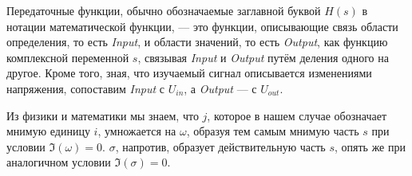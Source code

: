 \documentclass[a4paper, 10pt, final]{article} %
\begin{document}
    Передаточные функции, обычно обозначаемые заглавной буквой $H(s)$ в нотации математической функции, --- это функции, описывающие связь области определения, то есть \emph{Input}, и области значений, то есть \emph{Output}, как функцию комплексной переменной $s$, связывая \emph{Input} и \emph{Output} путём деления одного на другое.
    Кроме того, зная, что изучаемый сигнал описывается изменениями напряжения, сопоставим \emph{Input} с $U_{in}$, а \emph{Output} --- с $U_{out}$.

    Из физики и математики мы знаем, что $j$, которое в нашем случае обозначает мнимую единицу \(i\), умножается на $\omega$, образуя тем самым мнимую часть $s$ при условии $\Im(\omega) = 0$.
    \(\sigma\), напротив, образует действительную часть \(s\), опять же при аналогичном условии $\Im(\sigma) = 0$.
\end{document}
